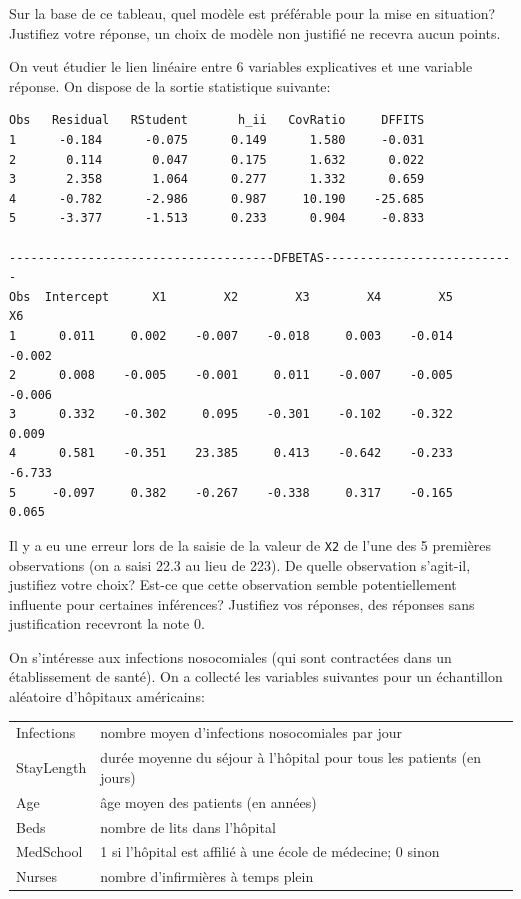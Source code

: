 \begin{questions}
	\vspace{0.1in}
	Sur la base de ce tableau, quel mod\`ele est préférable pour la mise en situation? Justifiez votre réponse, un choix de modèle non justifié ne recevra aucun points.


\newpage

\question[8]\label{influence}

On veut étudier le lien linéaire entre 6 variables explicatives et une variable réponse. On dispose de la sortie statistique suivante:

\begin{verbatim}
Obs   Residual   RStudent       h_ii   CovRatio     DFFITS
1      -0.184      -0.075      0.149      1.580     -0.031
2       0.114       0.047      0.175      1.632      0.022
3       2.358       1.064      0.277      1.332      0.659
4      -0.782      -2.986      0.987     10.190    -25.685
5      -3.377      -1.513      0.233      0.904     -0.833

-------------------------------------DFBETAS---------------------------
Obs  Intercept      X1        X2        X3        X4        X5        X6
1      0.011     0.002    -0.007    -0.018     0.003    -0.014    -0.002
2      0.008    -0.005    -0.001     0.011    -0.007    -0.005    -0.006
3      0.332    -0.302     0.095    -0.301    -0.102    -0.322     0.009
4      0.581    -0.351    23.385     0.413    -0.642    -0.233    -6.733
5     -0.097     0.382    -0.267    -0.338     0.317    -0.165     0.065

\end{verbatim}

Il y a eu une erreur lors de la saisie de la valeur de \texttt{X2} de l'une des 5 premières observations (on a saisi 22.3 au lieu de 223). De quelle observation s'agit-il, justifiez votre choix? Est-ce que cette observation semble potentiellement influente pour certaines inférences? Justifiez vos réponses, des réponses sans justification recevront la note 0.

\newpage

\question\label{application}
On s'intéresse aux infections nosocomiales (qui sont contractées dans un établissement de santé). On a collecté les variables suivantes pour un échantillon aléatoire d'hôpitaux américains:

\begin{tabular}{l|l}
	Infections & nombre moyen d'infections nosocomiales par jour \\
	StayLength & durée moyenne du séjour à l'hôpital pour tous les patients (en jours) \\
	Age & âge moyen des patients (en années) \\
	Beds & nombre de lits dans l'hôpital \\
	MedSchool & 1 si l'hôpital est affilié à une école de médecine; 0 sinon \\
	Nurses & nombre d'infirmières à temps plein
\end{tabular}


\end{questions}
